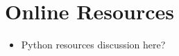 \documentclass[sigplan,screen]{acmart}
\begin{document}




\appendix

\section{Online Resources}

\begin{itemize}
    \item Python resources discussion here?
\end{itemize}
\end{document}
